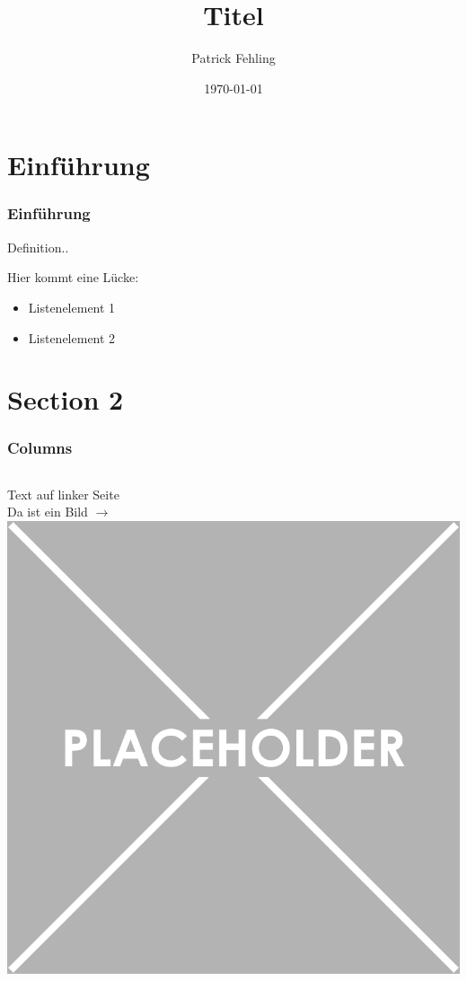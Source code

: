 \documentclass[xcolor=dvipsnames]{beamer}
\title{Titel}
\author{Patrick Fehling}
\date{\today}
\begin{document}
\maketitle
\frame{\tableofcontents}

\section{Einführung}

\begin{frame}
	\frametitle{Einführung}
	\begin{Definition}
		Definition..
	\end{Definition}
	Hier kommt eine Lücke:
	\vspace{4ex}
	\begin{itemize}
		\item Listenelement 1
		\item Listenelement 2
	\end{itemize}
\end{frame}

\section{Section 2}

\frame{\tableofcontents[current]}

\begin{frame}\frametitle{Columns}
	\begin{columns}[t,onlytextwidth]
			Text auf linker Seite\\
			Da ist ein Bild $\rightarrow$
		\centering
		\includegraphics[width=1.0\textwidth,valign=t]{pictures/placeholder}
	\end{columns}
\end{frame}
\end{document}
